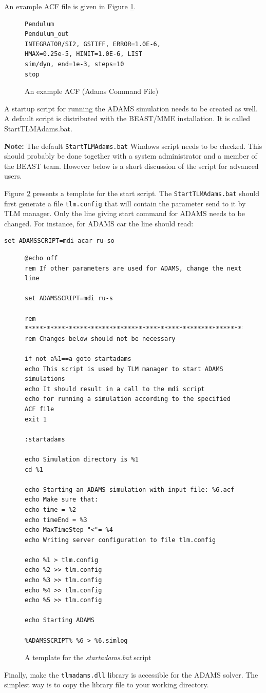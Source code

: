 An example ACF file is given in Figure \ref{figACFEx}.
\begin{figure}[h]
\small{
\begin{verbatim}
Pendulum
Pendulum_out
INTEGRATOR/SI2, GSTIFF, ERROR=1.0E-6,
HMAX=0.25e-5, HINIT=1.0E-6, LIST
sim/dyn, end=1e-3, steps=10
stop
\end{verbatim}
}
\caption{An example ACF (Adams Command File)\label{figACFEx}}
\end{figure}


A startup script for running the ADAMS simulation needs to be created
as well. A default script is distributed with the BEAST/MME
installation. It is called StartTLMAdams.bat.

{\bf Note:} The default \verb!StartTLMAdams.bat! Windows script needs to
be checked. This should probably be done together with a system
administrator and a member of the BEAST team. However below is a short
discussion of the script for advanced users.

Figure \ref{figStartadams} presents a template for the start script.
The \verb!StartTLMAdams.bat! should first generate a file \verb!tlm.config!
that will contain the parameter send to it by TLM manager.
Only the line giving start command for ADAMS needs to be changed.
For instance, for ADAMS car the line should read:
\begin{verbatim}
set ADAMSSCRIPT=mdi acar ru-so
\end{verbatim}

\begin{figure}[h]
\small{
\begin{verbatim}
@echo off
rem If other parameters are used for ADAMS, change the next line

set ADAMSSCRIPT=mdi ru-s

rem ***************************************************************
rem Changes below should not be necessary

if not a%1==a goto startadams
echo This script is used by TLM manager to start ADAMS simulations
echo It should result in a call to the mdi script
echo for running a simulation according to the specified ACF file
exit 1

:startadams

echo Simulation directory is %1
cd %1

echo Starting an ADAMS simulation with input file: %6.acf
echo Make sure that:
echo time = %2
echo timeEnd = %3
echo MaxTimeStep "<"= %4
echo Writing server configuration to file tlm.config

echo %1 > tlm.config
echo %2 >> tlm.config
echo %3 >> tlm.config
echo %4 >> tlm.config
echo %5 >> tlm.config

echo Starting ADAMS

%ADAMSSCRIPT% %6 > %6.simlog
\end{verbatim}
}
\caption{A template for the \emph{startadams.bat} script\label{figStartadams}}
\end{figure}

Finally, make the \verb!tlmadams.dll! library is accessible for the ADAMS solver.
The simplest way is to copy the library file to your working directory.


